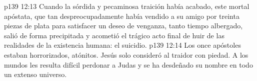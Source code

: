 \vs p139 12:13 Cuando la sórdida y pecaminosa traición había acabado, este mortal apóstata, que tan despreocupadamente había vendido a su amigo por treinta piezas de plata para satisfacer un deseo de venganza, tanto tiempo albergado, salió de forma precipitada y acometió el trágico acto final de huir de las realidades de la existencia humana: el suicidio.
\vs p139 12:14 Los once apóstoles estaban horrorizados, atónitos. Jesús solo consideró al traidor con piedad. A los mundos les resulta difícil perdonar a Judas y se ha desdeñado su nombre en todo un extenso universo.
